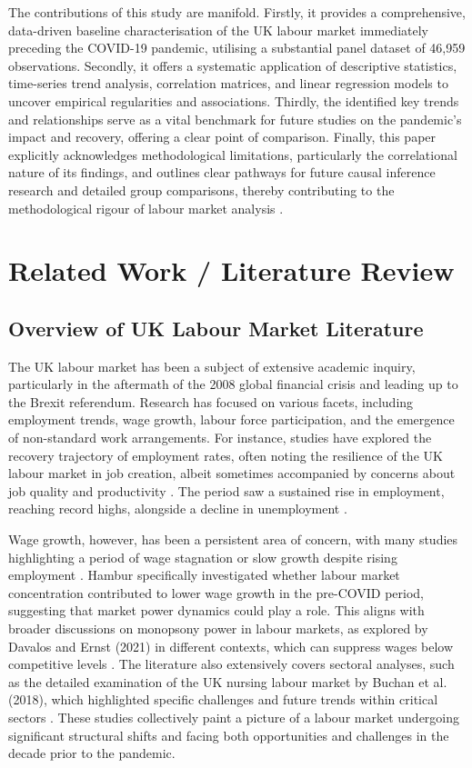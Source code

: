 \documentclass[11pt,a4paper]{article}
\begin{document}
The contributions of this study are manifold. Firstly, it provides a comprehensive, data-driven baseline characterisation of the UK labour market immediately preceding the COVID-19 pandemic, utilising a substantial panel dataset of 46,959 observations. Secondly, it offers a systematic application of descriptive statistics, time-series trend analysis, correlation matrices, and linear regression models to uncover empirical regularities and associations. Thirdly, the identified key trends and relationships serve as a vital benchmark for future studies on the pandemic's impact and recovery, offering a clear point of comparison. Finally, this paper explicitly acknowledges methodological limitations, particularly the correlational nature of its findings, and outlines clear pathways for future causal inference research and detailed group comparisons, thereby contributing to the methodological rigour of labour market analysis \cite{ref2}.

\section{Related Work / Literature Review}

\subsection{Overview of UK Labour Market Literature}

The UK labour market has been a subject of extensive academic inquiry, particularly in the aftermath of the 2008 global financial crisis and leading up to the Brexit referendum. Research has focused on various facets, including employment trends, wage growth, labour force participation, and the emergence of non-standard work arrangements. For instance, studies have explored the recovery trajectory of employment rates, often noting the resilience of the UK labour market in job creation, albeit sometimes accompanied by concerns about job quality and productivity \cite{ref7}. The period saw a sustained rise in employment, reaching record highs, alongside a decline in unemployment \cite{ref7}.

Wage growth, however, has been a persistent area of concern, with many studies highlighting a period of wage stagnation or slow growth despite rising employment \cite{ref1}. Hambur \cite{ref1} specifically investigated whether labour market concentration contributed to lower wage growth in the pre-COVID period, suggesting that market power dynamics could play a role. This aligns with broader discussions on monopsony power in labour markets, as explored by Davalos and Ernst (2021) in different contexts, which can suppress wages below competitive levels \cite{ref3}. The literature also extensively covers sectoral analyses, such as the detailed examination of the UK nursing labour market by Buchan et al. (2018), which highlighted specific challenges and future trends within critical sectors \cite{ref5, ref6}. These studies collectively paint a picture of a labour market undergoing significant structural shifts and facing both opportunities and challenges in the decade prior to the pandemic.
\end{document}
